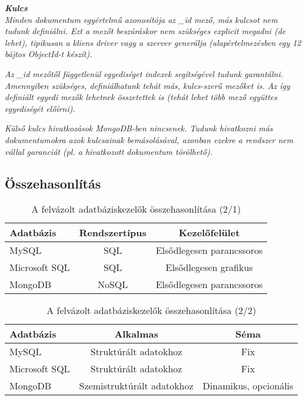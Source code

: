 \noindent\textit{\textbf{Kulcs}}\\

\textit{Minden dokumentum egyértelmű azonosítója az \_id mező, más kulcsot nem tudunk definiálni. Ezt a mezőt beszúráskor nem szükséges explicit megadni (de lehet), tipikusan a kliens driver vagy a szerver generálja (alapértelmezésben egy 12 bájtos ObjectId-t készít).}

\textit{Az \_id mezőtől függetlenül egyediséget indexek segítségével tudunk garantálni. \newline Amennyiben szükséges, definiálhatunk tehát más, kulcs-szerű mezőket is. Az így definiált egyedi mezők lehetnek összetettek is (tehát lehet több mező együttes egyediségét előírni).}

\textit{Külső kulcs hivatkozások MongoDB-ben nincsenek. Tudunk hivatkozni más dokumentumokra azok kulcsainak bemásolásával, azonban ezekre a rendszer nem vállal garanciát (pl. a hivatkozott dokumentum törölhető).}


\subsection{Összehasonlítás}

\begin{table}[h]
\centering
\caption{A felvázolt adatbáziskezelők összehasonlítása (2/1)}
\label{tab:db1}
\begin{tabular}{|l|c|c|}
\hline
Adatbázis & Rendszertípus &  Kezelőfelület\\
\hline
MySQL & SQL & Elsődlegesen parancssoros\\
\hline
Microsoft SQL & SQL & Elsődlegesen grafikus\\
\hline
MongoDB & NoSQL & Elsődlegesen parancssoros\\
\hline
\end{tabular}
\end{table}

\begin{table}[h]
\centering
\caption{A felvázolt adatbáziskezelők összehasonlítása (2/2)}
\label{tab:db2}
\begin{tabular}{|l|c|c|}
\hline
Adatbázis & Alkalmas &  Séma\\
\hline
MySQL & Struktúrált adatokhoz & Fix\\
\hline
Microsoft SQL & Struktúrált adatokhoz & Fix\\
\hline
MongoDB & Szemistruktúrált adatokhoz & Dinamikus, opcionális\\
\hline
\end{tabular}
\end{table}